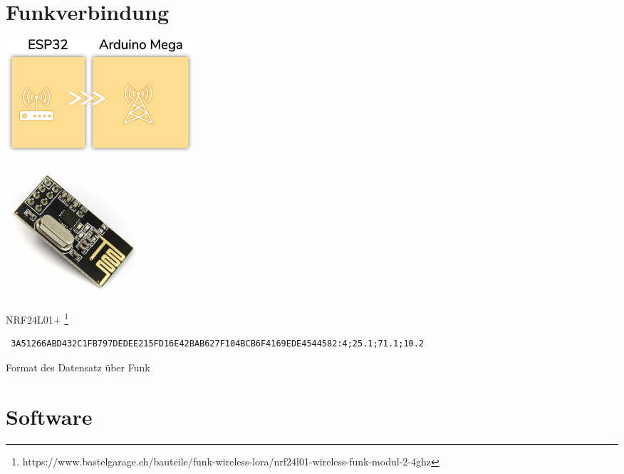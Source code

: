 \documentclass[
  12pt, %
  a4paper, %
  twoside, %
  openright, %
  numbers=noenddot, %
  BCOR=5mm, %
  parskip=half*, %
  thesis, %
]{bfhbook}
\begin{document}
 \section{Funkverbindung}
\begin{center}
    \begin{minipage}[b]{0.45\textwidth}
        \centering
        \includegraphics[width=7cm]{Bilder/ESP32-Arduino.png} %
        \captionsetup{justification=centering}
    \end{minipage}\hfill
    \begin{minipage}[b]{0.45\textwidth}
        \centering
        \includegraphics[width=5cm]{Bilder/NRF24.jpg} %
        \captionsetup{justification=centering}
    \end{minipage}
\end{center}
NRF24L01+ \footnote{https://www.bastelgarage.ch/bauteile/funk-wireless-lora/nrf24l01-wireless-funk-modul-2-4ghz}
 \begin{listing}[h]
 \begin{verbatim}
 3A51266ABD432C1FB797DEDEE215FD16E42BAB627F104BCB6F4169EDE4544582:4;25.1;71.1;10.2
 \end{verbatim}
  \caption{Format des Datensatz über Funk}
 \end{listing}

 \section{Software}
\end{document}

